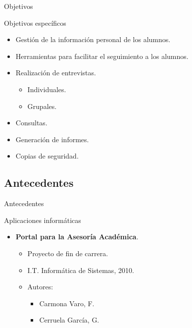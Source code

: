 \documentclass[10pt, hyperref={pdfpagelabels=false}]{beamer}
\begin{document}
      \begin{frame}{Objetivos}
        \begin{block}{Objetivos específicos}
          \begin{itemize}
           \item Gestión de la información personal de los alumnos.
           \item Herramientas para facilitar el seguimiento a los alumnos.
           \item Realización de entrevistas.
           \begin{itemize}
            \item Individuales.
            \item Grupales.
           \end{itemize}
           \item Consultas.
           \item Generación de informes.
           \item Copias de seguridad.
          \end{itemize}
        \end{block}
      \end{frame}


    \subsection{Antecedentes}
      \begin{frame}{Antecedentes}
        \begin{block}{Aplicaciones informáticas}
          \begin{itemize}
           \item \textbf{Portal para la Asesoría Académica}.
           \begin{itemize}
            \item Proyecto de fin de carrera.
            \item I.T. Informática de Sistemas, 2010.
            \item Autores:
            \begin{itemize}
              \item Carmona Varo, F.
              \item Cerruela García, G.
            \end{itemize}
           \end{itemize}
          \end{itemize}
        \end{block}
      \end{frame}
\end{document}
